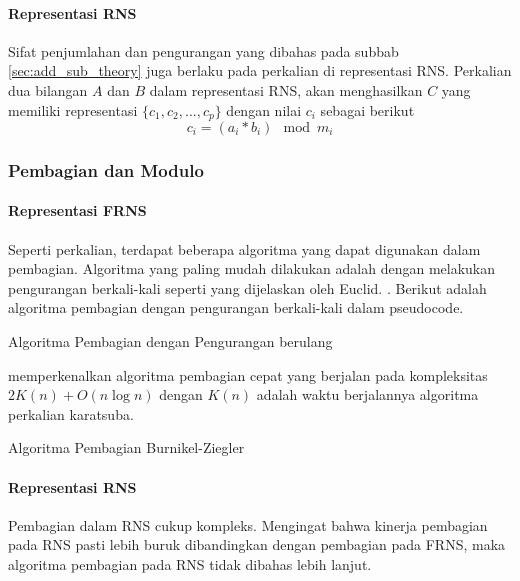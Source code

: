 \paragraph{Representasi RNS}
Sifat penjumlahan dan pengurangan yang dibahas pada subbab \ref{sec:add_sub_theory} juga berlaku pada perkalian di representasi RNS. Perkalian dua bilangan $A$ dan $B$ dalam representasi RNS, akan menghasilkan $C$ yang memiliki representasi $\{c_1,c_2,...,c_p\}$ dengan nilai $c_i$ sebagai berikut
\begin{equation}
    c_i = (a_i * b_i) \mod m_i
\end{equation}

\subsubsection{Pembagian dan Modulo}

\paragraph{Representasi FRNS}
Seperti perkalian, terdapat beberapa algoritma yang dapat digunakan dalam pembagian. Algoritma yang paling mudah dilakukan adalah dengan melakukan pengurangan berkali-kali seperti yang dijelaskan oleh Euclid. . Berikut adalah algoritma pembagian dengan pengurangan berkali-kali dalam pseudocode.

\begin{algorithm}
  \caption{Algoritma Pembagian dengan Pengurangan berulang}
  \label{alg:div_repeated_sub}
  \begin{algorithmic}
    \Statex
      \EndWhile
      \State {}
    \EndFunction
  \end{algorithmic}
\end{algorithm}

\citet{div_burnikel_ziegler} memperkenalkan algoritma pembagian cepat yang berjalan pada kompleksitas $2K(n)+O(n \log n)$ dengan $K(n)$ adalah waktu berjalannya algoritma perkalian karatsuba.

\begin{algorithm}
  \caption{Algoritma Pembagian Burnikel-Ziegler}
  \label{alg:div_burnikel_ziegler}
  \begin{algorithmic}
    \Statex

    \EndFunction
  \end{algorithmic}
\end{algorithm}

\paragraph{Representasi RNS}

Pembagian dalam RNS cukup kompleks. Mengingat bahwa kinerja pembagian pada RNS pasti lebih buruk dibandingkan dengan pembagian pada FRNS, maka algoritma pembagian pada RNS tidak dibahas lebih lanjut.
